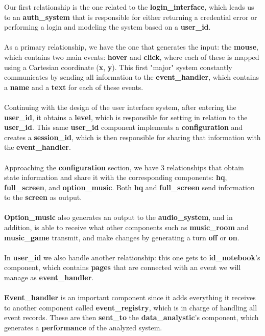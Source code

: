 \documentclass{article}
\begin{document}
Our first relationship is the one related to the \textbf{\textbf{login\_interface}}, 
which leads us to an \textbf{\textbf{auth\_system}} that is responsible for either returning a 
credential error or performing a login and modeling the system based on a \textbf{\textbf{user\_id}}.
\\
\\
As a primary relationship, we have the one that generates the input: the \textbf{\textbf{mouse}}, 
which contains two main events: \textbf{\textbf{hover}} and \textbf{\textbf{click}}, where each 
of these is mapped using a Cartesian coordinate (\textbf{\textbf{x}}, \textbf{\textbf{y}}). This 
first "major" system constantly communicates by sending all information 
to the \textbf{\textbf{event\_handler}}, which contains a \textbf{\textbf{name}} and 
a \textbf{\textbf{text}} for each of these events.
\\
\\
Continuing with the design of the user interface system, after entering the
 \textbf{\textbf{user\_id}}, it obtains a \textbf{\textbf{level}}, which is responsible for 
 setting in relation to the \textbf{\textbf{user\_id}}. This same \textbf{\textbf{user\_id}} 
 component implements a \textbf{\textbf{configuration}} and creates a \textbf{\textbf{session\_id}},
  which is then responsible for sharing that information with the \textbf{\textbf{event\_handler}}.
  \\
  \\
Approaching the \textbf{\textbf{configuration}} section, we have 3 relationships that obtain state
 information and share it with the corresponding components: \textbf{\textbf{hq}},
  \textbf{\textbf{full\_screen}}, and \textbf{\textbf{option\_music}}. Both \textbf{\textbf{hq}} 
  and \textbf{\textbf{full\_screen}} send information to the \textbf{\textbf{screen}} as output.
  \\
  \\
\textbf{\textbf{Option\_music}} also generates an output to the \textbf{\textbf{audio\_system}},
 and in addition, is able to receive what other components such as \textbf{\textbf{music\_room}}
 and \textbf{\textbf{music\_game}} transmit, and make changes by generating a turn 
 \textbf{\textbf{off}} or \textbf{\textbf{on}}.
 \\
 \\
In \textbf{\textbf{user\_id}} we also handle another relationship: this one gets to 
\textbf{\textbf{id\_notebook}}’s component, which contains \textbf{\textbf{pages}} 
that are connected with an event we will manage as \textbf{\textbf{event\_handler}}.
\\
\\
\textbf{\textbf{Event\_handler}} is an important component since it adds everything it receives 
to another component called \textbf{\textbf{event\_registry}}, which is in charge of handling all 
event records. These are then \textbf{\textbf{sent\_to}} the \textbf{\textbf{data\_analystic}}’s 
component, which generates a \textbf{\textbf{performance}} of the analyzed system.
\end{document}

